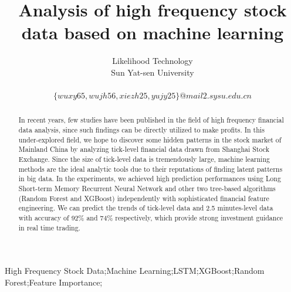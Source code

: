 \documentclass[10pt, conference, compsocconf]{IEEEtran}
\begin{document}
\title{Analysis of high frequency stock data based on machine learning}
\author
{
\IEEEauthorblockA
{
	Likelihood Technology\\
}
\IEEEauthorblockA
{
	Sun Yat-sen University\\
}
$ $\\
$\{wuxy65,wujh56,xiezh25,yujy25\}@mail2.sysu.edu.cn$
}
\maketitle
\begin{abstract}
In recent years, few studies have been published in the field of high frequency financial data analysis, since such findings can be directly 
utilized to make profits. In this under-explored field, we hope to discover some hidden patterns in the stock market of Mainland China by 
analyzing tick-level financial data drawn from Shanghai Stock Exchange. Since the size of tick-level data is tremendously large, machine 
learning methods are the ideal analytic tools due to their reputations of finding latent patterns in big data. In the experiments, we achieved 
high prediction performances using Long Short-term Memory Recurrent Neural Network and other two tree-based algorithms (Random Forest and 
XGBoost) independently with sophisticated financial feature engineering. We can predict the trends of tick-level data and 2.5 minutes-level 
data with accuracy of  92\% and 74\% respectively, which provide strong investment guidance in real time trading. 
\end{abstract}

\begin{IEEEkeywords}
High Frequency Stock Data;Machine Learning;LSTM;XGBoost;Random Forest;Feature Importance;
\end{IEEEkeywords}

\IEEEpeerreviewmaketitle
\end{document}
